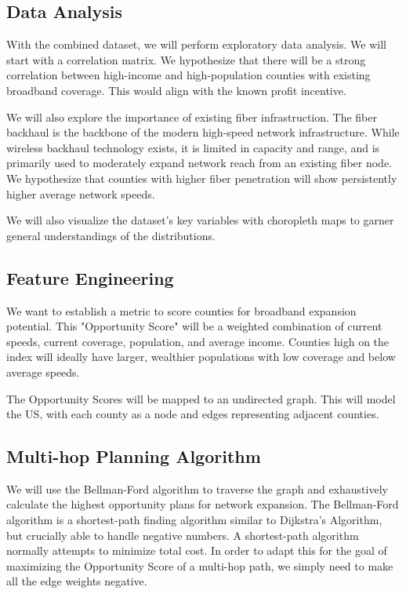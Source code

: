 \documentclass[11pt]{article}
\begin{document}
\subsection{Data Analysis}

With the combined dataset, we will perform exploratory data analysis. We will start with a correlation matrix. We hypothesize that there will be a strong correlation between high-income and high-population counties with existing broadband coverage. This would align with the known profit incentive.

We will also explore the importance of existing fiber infrastruction. The fiber backhaul is the backbone of the modern high-speed network infrastructure. While wireless backhaul technology exists, it is limited in capacity and range, and is primarily used to moderately expand network reach from an existing fiber node. We hypothesize that counties with higher fiber penetration will show persistently higher average network speeds.
			
We will also visualize the dataset's key variables with choropleth maps to garner general understandings of the distributions.

\subsection{Feature Engineering}

We want to establish a metric to score counties for broadband expansion potential. This "Opportunity Score" will be a weighted combination of current speeds, current coverage, population, and average income. Counties high on the index will ideally have larger, wealthier populations with low coverage and below average speeds. 

The Opportunity Scores will be mapped to an undirected graph. This will model the US, with each county as a node and edges representing adjacent counties.

\subsection{Multi-hop Planning Algorithm}

We will use the Bellman-Ford algorithm to traverse the graph and exhaustively calculate the highest opportunity plans for network expansion. The Bellman-Ford algorithm is a shortest-path finding algorithm similar to Dijkstra's Algorithm, but crucially able to handle negative numbers. A shortest-path algorithm normally attempts to minimize total cost. In order to adapt this for the goal of maximizing the Opportunity Score of a multi-hop path, we simply need to make all the edge weights negative. 
\end{document}
